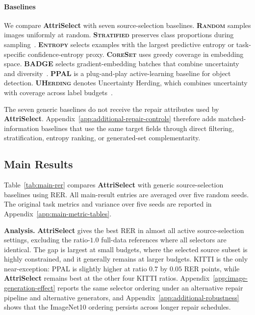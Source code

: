 \documentclass[10pt,twocolumn,letterpaper]{article}
\newcommand{\modelname}{AttriSelect}
\newcommand{\model}{\textcolor{darkteal}{\textbf{\modelname}}\xspace}
\begin{document}
\paragraph{Baselines}
We compare \model with seven source-selection baselines. \textbf{\textsc{Random}} samples images uniformly at random. \textbf{\textsc{Stratified}} preserves class proportions during sampling~\citep{neyman1934two}. \textbf{\textsc{Entropy}} selects examples with the largest predictive entropy or task-specific confidence-entropy proxy. \textbf{\textsc{CoreSet}} uses greedy coverage in embedding space. \textbf{\textsc{BADGE}} selects gradient-embedding batches that combine uncertainty and diversity~\citep{settles2009active,sener2018active,ash2020deep}. \textbf{\textsc{PPAL}} is a plug-and-play active-learning baseline for object detection. \textbf{\textsc{UHerding}} denotes Uncertainty Herding, which combines uncertainty with coverage across label budgets~\citep{yang2024ppal,bae2025uncertainty}.

The seven generic baselines do not receive the repair attributes used by \model. Appendix~\ref{app:additional-repair-controls} therefore adds matched-information baselines that use the same target fields through direct filtering, stratification, entropy ranking, or generated-set complementarity.

\subsection{Main Results}

Table~\ref{tab:main-rer} compares \model with generic source-selection baselines using RER. All main-result entries are averaged over five random seeds. The original task metrics and variance over five seeds are reported in Appendix~\ref{app:main-metric-tables}.

\noindent\textbf{Analysis.} \model gives the best RER in almost all active source-selection settings, excluding the ratio-$1.0$ full-data references where all selectors are identical. The gap is largest at small budgets, where the selected source subset is highly constrained, and it generally remains at larger budgets. KITTI is the only near-exception: PPAL is slightly higher at ratio $0.7$ by $0.05$ RER points, while \model remains best at the other four KITTI ratios. Appendix~\ref{app:image-generation-effect} reports the same selector ordering under an alternative repair pipeline and alternative generators, and Appendix~\ref{app:additional-robustness} shows that the ImageNet10 ordering persists across longer repair schedules.
\end{document}
